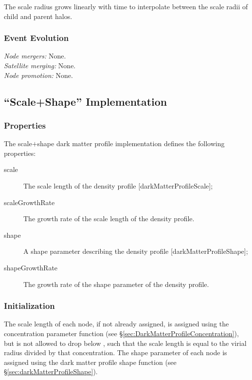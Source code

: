 The scale radius grows linearly with time to interpolate between the scale radii of child and parent halos.

\subsubsection{Event Evolution}

\noindent\emph{Node mergers:} None.\\

\noindent\emph{Satellite merging:} None.\\

\noindent\emph{Node promotion:} None.\\

\subsection{``Scale+Shape'' Implementation}\label{sec:DarkMatterProfileScaleShape}

\subsubsection{Properties}

The scale$+$shape dark matter profile implementation defines the following properties:
\begin{description}
 \item [{\normalfont \ttfamily scale}] The scale length of the density profile [{\normalfont \ttfamily darkMatterProfileScale}];
 \item [{\normalfont \ttfamily scaleGrowthRate}] The growth rate of the scale length of the density profile.
 \item [{\normalfont \ttfamily shape}] A shape parameter describing the density profile [{\normalfont \ttfamily darkMatterProfileShape}];
 \item [{\normalfont \ttfamily shapeGrowthRate}] The growth rate of the shape parameter of the density profile.
\end{description}

\subsubsection{Initialization}

The scale length of each node, if not already assigned, is assigned using the concentration parameter function (see \S\ref{sec:DarkMatterProfileConcentration}), but is not allowed to drop below {\normalfont \ttfamily [darkMatterProfileMinimumConcentration]}, such that the scale length is equal to the virial radius divided by that concentration. The shape parameter of each \gls{node} is assigned using the dark matter profile shape function (see \S\ref{sec:darkMatterProfileShape}).

